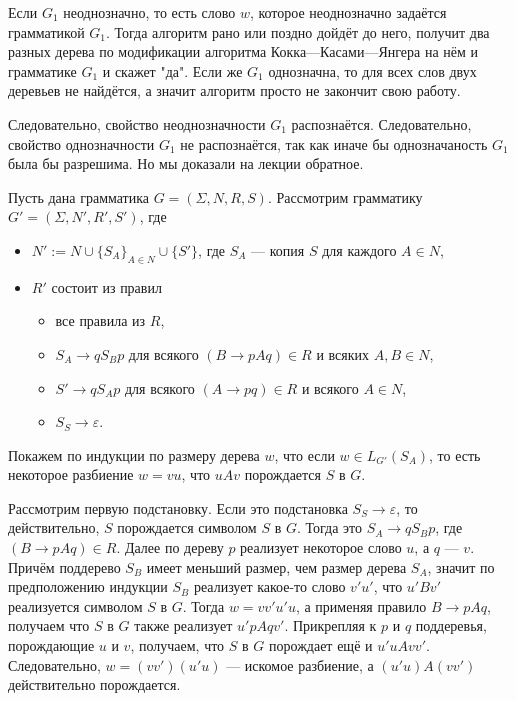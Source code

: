 \documentclass[12pt,a4paper]{article}
\begin{document}
\begin{problem}{4}
\begin{enumerate}
                Если $G_1$ неоднозначно, то есть слово $w$, которое неоднозначно задаётся грамматикой $G_1$. Тогда алгоритм рано или поздно дойдёт до него, получит два разных дерева по модификации алгоритма Кокка---Касами---Янгера на нём и грамматике $G_1$ и скажет "да". Если же $G_1$ однозначна, то для всех слов двух деревьев не найдётся, а значит алгоритм просто не закончит свою работу.

                Следовательно, свойство неоднозначности $G_1$ распознаётся. Следовательно, свойство однозначности $G_1$ не распознаётся, так как иначе бы однозначаность $G_1$ была бы разрешима. Но мы доказали на лекции обратное.
        \end{enumerate}
    \end{problem}

    \begin{problem}{5}
        Пусть дана грамматика $G = (\Sigma, N, R, S)$. Рассмотрим грамматику $G' = (\Sigma, N', R', S')$, где
        \begin{itemize}
            \item $N' := N \cup \{S_A\}_{A \in N} \cup \{S'\}$, где $S_A$ --- копия $S$ для каждого $A \in N$,
            \item $R'$ состоит из правил
                \begin{itemize}
                    \item все правила из $R$,
                    \item $S_A \to q S_B p$ для всякого $(B \to pAq) \in R$ и всяких $A, B \in N$,
                    \item $S' \to q S_A p$ для всякого $(A \to pq) \in R$ и всякого $A \in N$,
                    \item $S_S \to \varepsilon$.
                \end{itemize}
        \end{itemize}
        Покажем по индукции по размеру дерева $w$, что если $w \in L_{G'}(S_A)$, то есть некоторое разбиение $w = vu$, что $uAv$ порождается $S$ в $G$.

        Рассмотрим первую подстановку. Если это подстановка $S_S \to \varepsilon$, то действительно, $S$ порождается символом $S$ в $G$. Тогда это $S_A \to q S_B p$, где $(B \to pAq) \in R$. Далее по дереву $p$ реализует некоторое слово $u$, а $q$ --- $v$. Причём поддерево $S_B$ имеет меньший размер, чем размер дерева $S_A$, значит по предположению индукции $S_B$ реализует какое-то слово $v'u'$, что $u'Bv'$ реализуется символом $S$ в $G$. Тогда $w =  vv'u'u$, а применяя правило $B \to pAq$, получаем что $S$ в $G$ также реализует $u'pAqv'$. Прикрепляя к $p$ и $q$ поддеревья, порождающие $u$ и $v$, получаем, что $S$ в $G$ порождает ещё и $u'uAvv'$. Следовательно, $w = (vv')(u'u)$ --- искомое разбиение, а $(u'u)A(vv')$ действительно порождается.


\end{problem}
\end{document}
